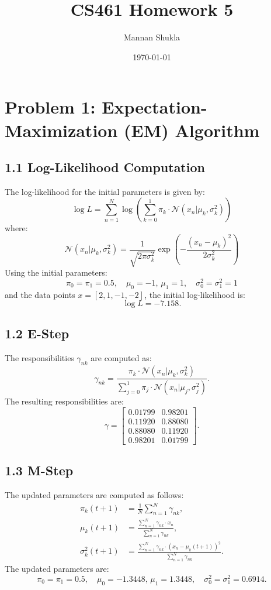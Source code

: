 \documentclass[11pt]{article}
\title{CS461 Homework 5}
\author{Mannan Shukla}
\date{\today}
\begin{document}
\maketitle

\section*{Problem 1: Expectation-Maximization (EM) Algorithm}

\subsection*{1.1 Log-Likelihood Computation} The log-likelihood for the initial parameters is given by:
\[
\log L = \sum_{n=1}^N \log \left( \sum_{k=0}^1 \pi_k \cdot \mathcal{N}(x_n | \mu_k, \sigma_k^2) \right)
\]
where:
\[
\mathcal{N}(x_n | \mu_k, \sigma_k^2) = \frac{1}{\sqrt{2\pi \sigma_k^2}} \exp\left( -\frac{(x_n - \mu_k)^2}{2\sigma_k^2} \right)
\]
Using the initial parameters:
\[
\pi_0 = \pi_1 = 0.5, \quad \mu_0 = -1, \, \mu_1 = 1, \quad \sigma_0^2 = \sigma_1^2 = 1
\]
and the data points \( x = [2, 1, -1, -2] \), the initial log-likelihood is:
\[
\log L = -7.158.
\]

\subsection*{1.2 E-Step}
The responsibilities \( \gamma_{nk} \) are computed as:
\[
\gamma_{nk} = \frac{\pi_k \cdot \mathcal{N}(x_n | \mu_k, \sigma_k^2)}{\sum_{j=0}^1 \pi_j \cdot \mathcal{N}(x_n | \mu_j, \sigma_j^2)}.
\]
The resulting responsibilities are:
\[
\gamma =
\begin{bmatrix}
0.01799 & 0.98201 \\
0.11920 & 0.88080 \\
0.88080 & 0.11920 \\
0.98201 & 0.01799
\end{bmatrix}.
\]

\subsection*{1.3 M-Step}
The updated parameters are computed as follows:
\begin{align*}
\pi_k(t+1) &= \frac{1}{N} \sum_{n=1}^N \gamma_{nk}, \\
\mu_k(t+1) &= \frac{\sum_{n=1}^N \gamma_{nk} \cdot x_n}{\sum_{n=1}^N \gamma_{nk}}, \\
\sigma_k^2(t+1) &= \frac{\sum_{n=1}^N \gamma_{nk} \cdot (x_n - \mu_k(t+1))^2}{\sum_{n=1}^N \gamma_{nk}}.
\end{align*}
The updated parameters are:
\[
\pi_0 = \pi_1 = 0.5, \quad \mu_0 = -1.3448, \, \mu_1 = 1.3448, \quad \sigma_0^2 = \sigma_1^2 = 0.6914.
\]
\end{document}
